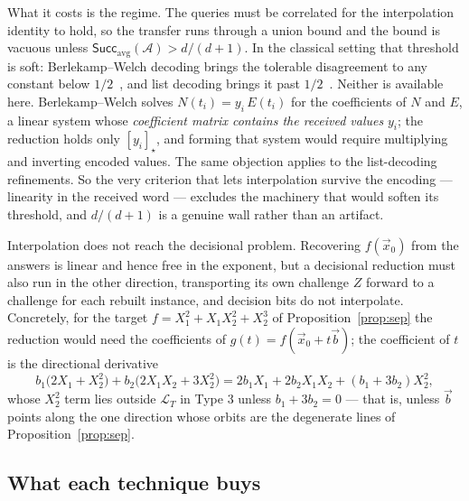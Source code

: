 \documentclass{conjura-solution}
\newcommand{\vx}{\vec{x}}
\newcommand{\vb}{\vec{b}}
\newcommand{\Succ}{\mathsf{Succ}}
\newcommand{\LL}{\mathcal{L}}
\begin{document}
What it costs is the regime. The queries must be correlated for the interpolation identity to
hold, so the transfer runs through a union bound and the bound is vacuous unless
$\Succ_{\mathrm{avg}}(\mathcal A)>d/(d+1)$. In the classical setting that threshold is soft:
Berlekamp--Welch decoding brings the tolerable disagreement to any constant below
$1/2$~\cite{GS92}, and list decoding brings it past $1/2$~\cite{Sudan97,STV01}. Neither is
available here. Berlekamp--Welch solves $N(t_i)=y_i\,E(t_i)$ for the coefficients of $N$ and
$E$, a linear system whose \emph{coefficient matrix contains the received values} $y_i$; the
reduction holds only $[y_i]_\star$, and forming that system would require multiplying and
inverting encoded values. The same objection applies to the list-decoding refinements. So the
very criterion that lets interpolation survive the encoding --- linearity in the received word
--- excludes the machinery that would soften its threshold, and $d/(d+1)$ is a genuine wall
rather than an artifact.

\begin{remark}
\label{rem:decblock}
Interpolation does not reach the decisional problem. Recovering $f(\vx_0)$ from the answers is
linear and hence free in the exponent, but a decisional reduction must also run in the other
direction, transporting its own challenge $Z$ forward to a challenge for each rebuilt
instance, and decision bits do not interpolate. Concretely, for the target
$f=X_1^{2}+X_1X_2^{2}+X_2^{3}$ of Proposition~\ref{prop:sep} the reduction would need the
coefficients of $g(t)=f(\vx_0+t\vb)$; the coefficient of $t$ is the directional derivative
\[
  b_1\bigl(2X_1+X_2^{2}\bigr)+b_2\bigl(2X_1X_2+3X_2^{2}\bigr)
  =2b_1X_1+2b_2X_1X_2+(b_1+3b_2)X_2^{2},
\]
whose $X_2^{2}$ term lies outside $\LL_T$ in Type 3 unless $b_1+3b_2=0$ --- that is, unless
$\vb$ points along the one direction whose orbits are the degenerate lines of
Proposition~\ref{prop:sep}.
\end{remark}

\subsection{What each technique buys}
\end{document}
